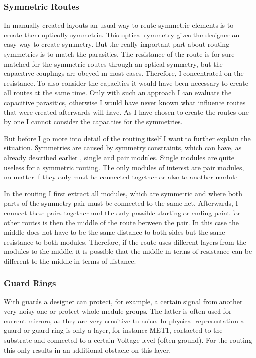\subsubsection{Symmetric Routes}
In manually created layouts an usual way to route symmetric elements is to create them optically symmetric. This optical symmetry gives the designer an easy way to create symmetry. But the really important part about routing symmetries is to match the parasitics. The resistance of the route is for sure matched for the symmetric routes through an optical symmetry, but the capacitive couplings are obeyed in most cases. Therefore, I concentrated on the resistance. To also consider the capacities it would have been necessary to create all routes at the same time. Only with such an approach I can evaluate the capacitive parasitics, otherwise I would have never known what influence routes that were created afterwards will have. As I have chosen to create the routes one by one I cannot consider the capacities for the symmetries.

But before I go more into detail of the routing itself I want to further explain the situation. Symmetries are caused by symmetry constraints, which can have, as already described earlier , single and pair modules. Single modules are quite useless for a symmetric routing. The only modules of interest are pair modules, no matter if they only must be connected together or also to another module.

In the routing I first extract all modules, which are symmetric and where both parts of the symmetry pair must be connected to the same net. Afterwards, I connect these pairs together and the only possible starting or ending point for other routes is then the middle of the route between the pair. In this case the middle does not have to be the same distance to both sides but the same resistance to both modules. Therefore, if the route uses different layers from the modules to the middle, it is possible that the middle in terms of resistance can be different to the middle in terms of distance.

\subsubsection{Guard Rings}
With guards  a designer can protect, for example, a certain signal from another very noisy one or protect whole module groups. The latter is often used for current mirrors, as they are very sensitive to noise. In physical representation a guard or guard ring is only a layer, for instance MET1, contacted to the substrate and connected to a certain Voltage level (often ground). For the routing this only results in an additional obstacle on this layer.

